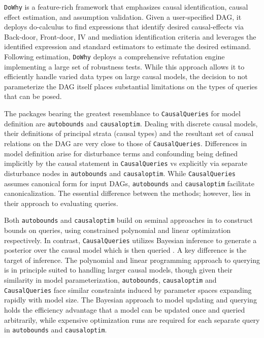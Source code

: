 \documentclass[
  11pt,
  article]{jss}
\begin{document}
\texttt{DoWhy} is a feature-rich framework that emphasizes causal
identification, causal effect estimation, and assumption validation.
Given a user-specified DAG, it deploys do-calculus to find expressions
that identify desired causal-effects via Back-door, Front-door, IV and
mediation identification criteria and leverages the identified
expression and standard estimators to estimate the desired estimand.
Following estimation, \texttt{DoWhy} deploys a comprehensive refutation
engine implementing a large set of robustness tests. While this approach
allows it to efficiently handle varied data types on large causal
models, the decision to not parameterize the DAG itself places
substantial limitations on the types of queries that can be posed.

The packages bearing the greatest resemblance to \texttt{CausalQueries}
for model definition are \texttt{autobounds} and \texttt{causaloptim}.
Dealing with discrete causal models, their definitions of principal
strata (causal types) and the resultant set of causal relations on the
DAG are very close to those of \texttt{CausalQueries}. Differences in
model definition arise for disturbance terms and confounding being
defined implicitly by the causal statement in \texttt{CausalQueries} vs
explicitly via separate disturbance nodes in \texttt{autobounds} and
\texttt{causaloptim}. While \texttt{CausalQueries} assumes canonical
form for input DAGs, \texttt{autobounds} and \texttt{causaloptim}
facilitate canonicalization. The essential difference between the
methods; however, lies in their approach to evaluating queries.

Both \texttt{autobounds} and \texttt{causaloptim} build on seminal
approaches in \citet{balke_bounds_1997} to construct bounds on queries,
using constrained polynomial and linear optimization respectively. In
contrast, \texttt{CausalQueries} utilizes Bayesian inference to generate
a posterior over the causal model which is then queried
\citep[consistent
with][]{chickering_clinicians_1996, zhang_partial_2022}. A key
difference is the target of inference. The polynomial and linear
programming approach to querying is in principle suited to handling
larger causal models, though given their similarity in model
parameterization, \texttt{autobounds}, \texttt{causaloptim} and
\texttt{CausalQueries} face similar constraints induced by parameter
spaces expanding rapidly with model size. The Bayesian approach to model
updating and querying holds the efficiency advantage that a model can be
updated once and queried arbitrarily, while expensive optimization runs
are required for each separate query in \texttt{autobounds} and
\texttt{causaloptim}.
\end{document}
